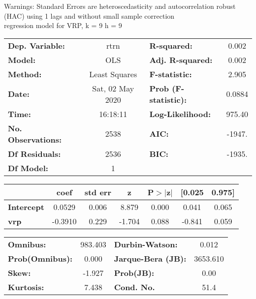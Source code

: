 Warnings: \newline
 [1] Standard Errors are heteroscedasticity and autocorrelation robust (HAC) using 1 lags and without small sample correction\\ 

regression model for VRP, k = 9 h = 9\begin{center}
\begin{tabular}{lclc}
\toprule
\textbf{Dep. Variable:}    &       rtrn       & \textbf{  R-squared:         } &     0.002   \\
\textbf{Model:}            &       OLS        & \textbf{  Adj. R-squared:    } &     0.002   \\
\textbf{Method:}           &  Least Squares   & \textbf{  F-statistic:       } &     2.905   \\
\textbf{Date:}             & Sat, 02 May 2020 & \textbf{  Prob (F-statistic):} &   0.0884    \\
\textbf{Time:}             &     16:18:11     & \textbf{  Log-Likelihood:    } &    975.40   \\
\textbf{No. Observations:} &        2538      & \textbf{  AIC:               } &    -1947.   \\
\textbf{Df Residuals:}     &        2536      & \textbf{  BIC:               } &    -1935.   \\
\textbf{Df Model:}         &           1      & \textbf{                     } &             \\
\bottomrule
\end{tabular}
\begin{tabular}{lcccccc}
                   & \textbf{coef} & \textbf{std err} & \textbf{z} & \textbf{P$> |$z$|$} & \textbf{[0.025} & \textbf{0.975]}  \\
\midrule
\textbf{Intercept} &       0.0529  &        0.006     &     8.879  &         0.000        &        0.041    &        0.065     \\
\textbf{vrp}       &      -0.3910  &        0.229     &    -1.704  &         0.088        &       -0.841    &        0.059     \\
\bottomrule
\end{tabular}
\begin{tabular}{lclc}
\textbf{Omnibus:}       & 983.403 & \textbf{  Durbin-Watson:     } &    0.012  \\
\textbf{Prob(Omnibus):} &   0.000 & \textbf{  Jarque-Bera (JB):  } & 3653.610  \\
\textbf{Skew:}          &  -1.927 & \textbf{  Prob(JB):          } &     0.00  \\
\textbf{Kurtosis:}      &   7.438 & \textbf{  Cond. No.          } &     51.4  \\
\bottomrule
\end{tabular}
\end{center}

